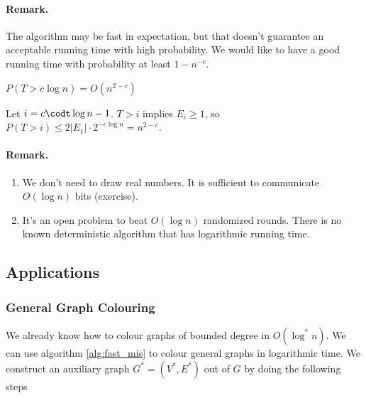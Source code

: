 \paragraph{Remark.} The algorithm may be fast in expectation, but that doesn't guarantee an acceptable running time with high probability. We would like to have a good running time with probability at least $1-n^{-c}$.

\begin{thm} $P(T> c\log n) = O(n^{2-c})$\end{thm}
\begin{pr} Let $i=c\codt \log n -1$. $T>i$ implies $E_i\geq 1$, so $P(T > i) \leq 2|E_1| \cdot 2^{-c\log n} = n^{2-c}$.\end{pr}

\paragraph{Remark.} \begin{enumerate}
\item We don't need to draw real numbers. It is sufficient to communicate $O(\log n)$ bits (exercise). 
\item It's an open problem to beat $O(\log n)$ randomized rounds. There is no known deterministic algorithm that has logarithmic running time.
\end{enumerate}

\subsection{Applications}

\subsubsection{General Graph Colouring}

We already know how to colour graphs of bounded degree in $O(\log^* n)$. We can use algorithm \ref{alg:fast_mis} to colour general graphs in logarithmic time. We construct an auxiliary graph $G^* = (V^*, E^*)$ out of $G$ by doing the following steps

